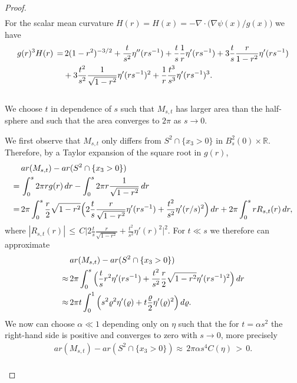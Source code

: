 \documentclass[reqno,makeidx,12pt]{amsart}
\theoremstyle{note}
\theoremstyle{definition}
\begin{document}
\begin{proof}
\begin{gather}
\end{gather}
For the scalar mean curvature $H(r)=H(x)=-\nabla\cdot
\big(\nabla\psi(x)/g(x)\big)$ we have 
\begin{align}
  g(r)^3 H(r)\,=&\, 2(1-r^2)^{-3/2} + \frac{t}{s^2}\eta''(rs^{-1}) +
  \frac{t}{s}\frac{1}{r} \eta'(rs^{-1}) + 3
  \frac{t}{s}\frac{r}{1-r^2}\eta'(rs^{-1}) \notag\\
  &+ 3\frac{t^2}{s^2}\frac{1}{\sqrt{1-r^2}}\eta'(rs^{-1})^2 +
  \frac{1}{r}\frac{t^3}{s^3} \eta'(rs^{-1})^3. \label{eq:comp-H}
\end{align}
{\mbox{}\\\underline{}}
We choose $t$ in dependence of $s$ such that $M_{s,t}$ has larger area
than the half-sphere and such that the area converges to $2\pi$ as $s\to
0$.

We first observe that $M_{s,t}$ only differs from $S^2\cap\{x_3>0\}$ in
$B_s^2(0)\times{\mathbb R}$. Therefore, by a Taylor expansion of the square root
in $g(r)$,
\begin{align}
  &{ar}(M_{s,t})-{ar}(S^2\cap\{x_3>0\})\notag\\
  =\, &\int_0^s 2\pi r g(r)\,dr -
  \int_0^s 2\pi r \frac{1}{\sqrt{1-r^2}}\,dr \notag\\
  =\, &2\pi \int_0^s
  \frac{r}{2}\sqrt{1-r^2}\Big(2\frac{t}{s}\frac{r}{\sqrt{1-r^2}}\eta'(rs^{-1}) +
  \frac{t^2}{s^2}\eta'(r/s)^2\Big)\, dr + 2\pi\int_0^s r R_{s,t}(r)\,dr,
  \label{eq:diff-area1} 
\end{align}
where $|R_{s,t}(r)|\,\leq\, C\Big|2\frac{t}{s}\frac{r}{\sqrt{1-r^2}} +
\frac{t^2}{s^2}\eta'(r)^2\Big|^2$. For $t\ll s$ we therefore can approximate
\begin{align}
  &{ar}(M_{s,t})-{ar}(S^2\cap\{x_3>0\}) \notag\\
  \approx\,&
  2\pi \int_0^s\Big(
  \frac{t}{s}r^2\eta'(rs^{-1}) +
  \frac{t^2}{s^2}\frac{r}{2}\sqrt{1-r^2}\eta'(rs^{-1})^2 \Big)\,dr
  \notag\\
  \approx\,& 2\pi t\int_0^1 \Big(s^2\varrho^2\eta'(\varrho) +
  t\frac{\varrho}{2}\eta'(\varrho)^2\Big)\, d\varrho.
  \label{eq:diff-area2} 
\end{align}
We now can choose $\alpha\ll1$ depending only on $\eta$ such that the
for $t=\alpha s^2$ the right-hand side is positive and converges to zero
with $s\to 0$, more precisely
\begin{gather}
  {ar}(M_{s,t})-{ar}(S^2\cap\{x_3>0\}) 
  \approx\, 2\pi \alpha s^4 C(\eta)\,>\,0. \label{eq:asym-area}
\end{gather}
{\mbox{}\\\underline{}}

\end{proof}
\end{document}
